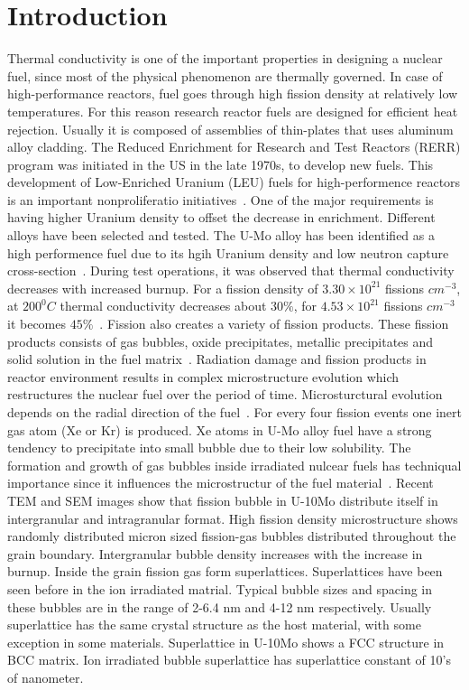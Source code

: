 \section{Introduction}
\begin{doublespacing}
Thermal conductivity is one of the important properties in designing a nuclear fuel, since most of the physical phenomenon are thermally governed. In case of high-performance reactors, fuel goes through high fission density at relatively low temperatures. For this reason research reactor fuels are designed for efficient heat rejection. Usually it is composed of assemblies of thin-plates that uses aluminum alloy cladding. The Reduced Enrichment for Research and Test Reactors (RERR) program was initiated in the US in the late 1970s, to develop new fuels. This development of Low-Enriched Uranium (LEU) fuels for high-performence reactors is an important nonproliferatio initiatives~\cite{snelgrove1997development}. One of the major requirements is having higher Uranium density to offset the decrease in enrichment. Different alloys have been selected and tested. The U-Mo alloy has been identified as a high performence fuel due to its hgih Uranium density and low neutron capture cross-section~\cite{ewh2010microstructural,smirnova2013ternary,rest2009analysis,landa2013density}. During test operations, it was observed that thermal conductivity decreases with increased burnup. For a fission density of $3.30\times10^{21}$ fissions $cm^{-3}$, at $200^0C$ thermal conductivity decreases about $30\%$, for $4.53\times10^{21}$ fissions $cm^{-3}$ it becomes $45\%$~\cite{burkes2015thermal}. Fission also creates a variety of fission products. These fission products consists of gas bubbles, oxide precipitates, metallic precipitates and solid solution in the fuel matrix~\cite{rondinella2010high}. Radiation damage and fission products in reactor environment results in complex microstructure evolution which restructures the nuclear fuel over the period of time. Microsturctural evolution depends on the radial direction of the fuel~\cite{stehle1988performance,noirot2008detailed, meyer2014irradiation}. For every four fission events one inert gas atom (Xe or Kr) is produced. Xe atoms in U-Mo alloy fuel have a strong tendency to precipitate into small bubble due to their low solubility. The formation and growth of gas bubbles inside irradiated nulcear fuels has techniqual importance since it  influences the microstructur of the fuel material~\cite{kim2011fission}. Recent TEM and SEM images show that fission bubble in U-10Mo distribute itself in intergranular and intragranular format. High fission density microstructure shows randomly distributed micron sized fission-gas bubbles distributed throughout the grain boundary. Intergranular bubble density increases with the increase in burnup. Inside the grain fission gas form superlattices. Superlattices have been seen before in the ion irradiated matrial. Typical bubble sizes and spacing in these bubbles are in the range of 2-6.4 nm and 4-12 nm respectively. Usually superlattice has the same crystal structure as the host material, with some exception in some materials. Superlattice in U-10Mo shows a FCC structure in BCC matrix. Ion irradiated bubble superlattice has superlattice constant of 10's of nanometer.


\end{doublespacing}
